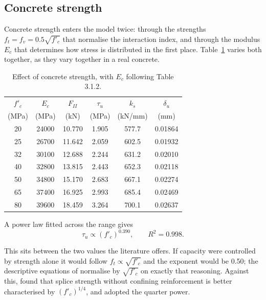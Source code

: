 \subsection{Concrete strength}
\label{sec:matfc}
 
Concrete strength enters the model twice: through the strengths
$f_t = f_v = 0.5\sqrt{f'_c}$ that normalise the interaction index, and
through the modulus $E_c$ that determines how stress is distributed in the
first place. Table~\ref{tab:sweepfc} varies both together, as they vary
together in a real concrete.
 
\begin{table}[H]
\centering
\caption{Effect of concrete strength, with $E_c$ following
         \textcite{as3600ConcreteStructures2018} Table 3.1.2.}
\label{tab:sweepfc}
\small
\begin{tabular*}{\linewidth}{@{\extracolsep{\fill}}cccccc@{}}
\hline
$f'_c$ & $E_c$ & $F_{II}$ & $\tau_u$ & $k_s$ & $\delta_u$ \\
(MPa)  & (MPa) & (kN)      & (MPa)    & (kN/mm) & (mm) \\
\hline
20 & 24000 & 10.770 & 1.905 & 577.7 & 0.01864 \\
25 & 26700 & 11.642 & 2.059 & 602.5 & 0.01932 \\
32 & 30100 & 12.688 & 2.244 & 631.2 & 0.02010 \\
40 & 32800 & 13.815 & 2.443 & 652.3 & 0.02118 \\
50 & 34800 & 15.170 & 2.683 & 667.1 & 0.02274 \\
65 & 37400 & 16.925 & 2.993 & 685.4 & 0.02469 \\
80 & 39600 & 18.459 & 3.264 & 700.1 & 0.02637 \\
\hline
\end{tabular*}
\end{table}
 
A power law fitted across the range gives
\begin{equation}
\label{eq:fcexp}
\tau_u \propto (f'_c)^{0.390}, \qquad R^2 = 0.998 .
\end{equation}
 
This sits between the two values the literature offers. If capacity were
controlled by strength alone it would follow $f_t \propto \sqrt{f'_c}$ and
the exponent would be \num{0.50}; the descriptive equations of
\textcite{orangunStrengthAnchoredBars} normalise by $\sqrt{f'_c}$ on exactly
that reasoning. Against this, \textcite{SpliceStrengthConventional2000}
found that splice strength without confining reinforcement is better
characterised by $(f'_c)^{1/4}$, and
\textcite{408R03BondDevelopment} adopted the quarter power.
 
